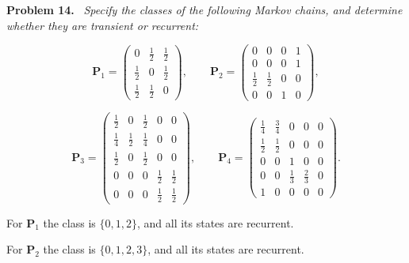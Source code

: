\documentclass[11pt]{article}
\newenvironment{problem}[1]
  {\par\medskip\noindent\textbf{Problem #1.}\ \itshape}
  {\par\medskip}
\begin{document}
\begin{problem}{14}
Specify the classes of the following Markov chains, and determine whether they are transient or recurrent:

$$\mathbf{P}_1=\begin{pmatrix}0&\tfrac12&\tfrac12\\[2pt]\tfrac12&0&\tfrac12\\[2pt]\tfrac12&\tfrac12&0\end{pmatrix},\qquad
\mathbf{P}_2=\begin{pmatrix}0&0&0&1\\[2pt]0&0&0&1\\[2pt]\tfrac12&\tfrac12&0&0\\[2pt]0&0&1&0\end{pmatrix},$$

$$\mathbf{P}_3=\begin{pmatrix}\tfrac12&0&\tfrac12&0&0\\[2pt]\tfrac14&\tfrac12&\tfrac14&0&0\\[2pt]\tfrac12&0&\tfrac12&0&0\\[2pt]0&0&0&\tfrac12&\tfrac12\\[2pt]0&0&0&\tfrac12&\tfrac12\end{pmatrix},\qquad
\mathbf{P}_4=\begin{pmatrix}\tfrac14&\tfrac34&0&0&0\\[2pt]\tfrac12&\tfrac12&0&0&0\\[2pt]0&0&1&0&0\\[2pt]0&0&\tfrac13&\tfrac23&0\\[2pt]1&0&0&0&0\end{pmatrix}.$$
\end{problem}
For $\mathbf{P}_1$ the class is $\{0,1,2\}$, and all its states are recurrent.

\begin{center}
\end{center}

For $\mathbf{P}_2$ the class is $\{0,1,2,3\}$, and all its states are recurrent.
\end{document}
